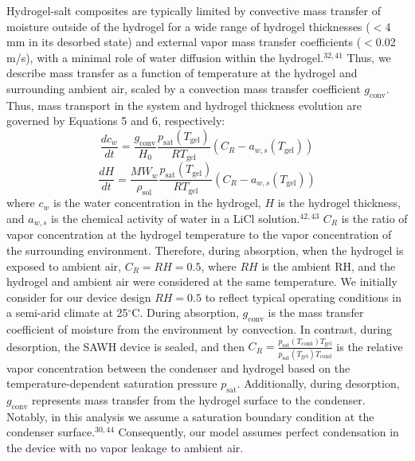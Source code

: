 \documentclass[11pt]{article}
\begin{document}
Hydrogel-salt composites are typically limited by convective mass transfer of moisture outside of the hydrogel for a wide range of hydrogel thicknesses ($<$4 mm in its desorbed state) and external vapor mass transfer coefficients ($<$0.02 m/s), with a minimal role of water diffusion within the hydrogel.$^{32,41}$ Thus, we describe mass transfer as a function of temperature at the hydrogel and surrounding ambient air, scaled by a convection mass transfer coefficient $g_{\mathrm{conv}}$. Thus, mass transport in the system and hydrogel thickness evolution are governed by Equations 5 and 6, respectively:
\begin{equation}
\frac{dc_{w}}{dt} = \frac{g_{\mathrm{conv}}}{H_{0}}\frac{p_{\mathrm{sat}}\left(T_{\mathrm{gel}}\right)}{RT_{\mathrm{gel}}}\left(C_{R} - a_{w,s}\left(T_{\mathrm{gel}}\right)\right)
\end{equation}
\begin{equation}
\frac{dH}{dt} = \frac{MW_{w}}{\rho_{\mathrm{sol}}}\frac{p_{\mathrm{sat}}\left(T_{\mathrm{gel}}\right)}{RT_{\mathrm{gel}}}\left(C_{R} - a_{w,s}\left(T_{\mathrm{gel}}\right)\right)
\end{equation}
where $c_{w}$ is the water concentration in the hydrogel, $H$ is the hydrogel thickness, and $a_{w,s}$ is the chemical activity of water in a LiCl solution.$^{42,43}$ $C_{R}$ is the ratio of vapor concentration at the hydrogel temperature to the vapor concentration of the surrounding environment. Therefore, during absorption, when the hydrogel is exposed to ambient air, $C_{R} = RH = 0.5$, where $RH$ is the ambient RH, and the hydrogel and ambient air were considered at the same temperature. We initially consider for our device design $RH = 0.5$ to reflect typical operating conditions in a semi-arid climate at 25$^{\circ}$C. During absorption, $g_{\mathrm{conv}}$ is the mass transfer coefficient of moisture from the environment by convection. In contrast, during desorption, the SAWH device is sealed, and then $C_{R} = \frac{p_{\mathrm{sat}}(T_{\mathrm{cond}})T_{\mathrm{gel}}}{p_{\mathrm{sat}}(T_{\mathrm{gel}})T_{\mathrm{cond}}}$ is the relative vapor concentration between the condenser and hydrogel based on the temperature-dependent saturation pressure $p_{\mathrm{sat}}$. Additionally, during desorption, $g_{\mathrm{conv}}$ represents mass transfer from the hydrogel surface to the condenser. Notably, in this analysis we assume a saturation boundary condition at the condenser surface.$^{30,44}$ Consequently, our model assumes perfect condensation in the device with no vapor leakage to ambient air.
\end{document}

